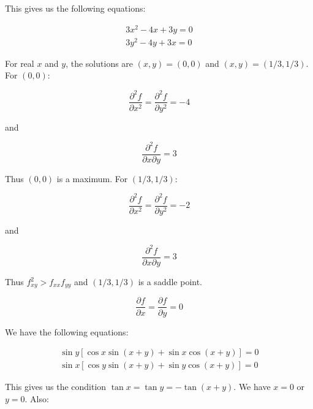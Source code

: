 \documentclass[12pt]{article}
\begin{document}
This gives us the following equations:

\begin{equation}
    \begin{split}
        3x^{2} - 4x + 3y = 0 \\
        3y^{2} - 4y + 3x = 0
    \end{split}
\end{equation}

For real $x$ and $y$, the solutions are $(x, y) = (0, 0)$ and $(x, y) = (1/3, 1/3)$. For $(0, 0)$:

\begin{equation}
    \frac{\partial^{2} f}{\partial x^{2}} = \frac{\partial^{2} f}{\partial y^{2}} = -4
\end{equation}

and

\begin{equation}
    \frac{\partial^{2} f}{\partial x \partial y} = 3
\end{equation}

Thus $(0, 0)$ is a maximum. For $(1/3,  1/3)$:

\begin{equation}
    \frac{\partial^{2} f}{\partial x^{2}} = \frac{\partial^{2} f}{\partial y^{2}} = -2
\end{equation}

and

\begin{equation}
    \frac{\partial^{2} f}{\partial x \partial y} = 3
\end{equation}

Thus $f_{xy}^{2} > f_{xx} f_{yy}$ and $(1/3,  1/3)$ is a saddle point.


\begin{equation}
    \frac{\partial f}{\partial x} = \frac{\partial f}{\partial y} = 0
\end{equation}

We have the following equations:

\begin{equation}
    \begin{split}
        \sin{y} \left[ \cos{x}\sin{(x + y)} + \sin{x}\cos{(x + y)} \right] = 0 \\
        \sin{x} \left[ \cos{y}\sin{(x + y)} + \sin{y}\cos{(x + y)} \right] = 0
    \end{split}
\end{equation}

This gives us the condition $\tan{x} = \tan{y} = -\tan{(x + y)}$. We have $x = 0$ or $y = 0$. Also:
\end{document}
